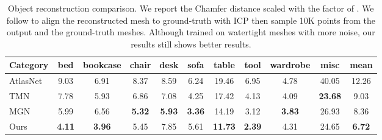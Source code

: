 \documentclass[final]{cvpr}
\newcommand{\beforecaption}{\vspace{-1.2em}}
\begin{document}
\begin{table*}[!h]
    \vspace{-1.5em}
	\begin{center}
		\begin{tabular}{|l|c c c c c c c c c|c|}
			\hline
			Category & bed & bookcase & chair & desk & sofa & table & tool & wardrobe & misc & mean\\
			\hline\hline
			AtlasNet \cite{groueix2018} & 9.03 & 6.91 & 8.37 & 8.59 & 6.24 & 19.46 & 6.95 & 4.78 & 40.05 & 12.26\\
			TMN \cite{pan2019deep} & 7.78 & 5.93 & 6.86 & 7.08 & 4.25 & 17.42 & 4.13 & 4.09 & \textbf{23.68} & 9.03\\
			MGN \cite{nie2020total3dunderstanding} & 5.99 & 6.56 & \textbf{5.32} & \textbf{5.93} & \textbf{3.36} & 14.19 & 3.12 & \textbf{3.83} & 26.93 & 8.36\\
			Ours & \textbf{4.11} & \textbf{3.96} & 5.45 & 7.85 & 5.61 & \textbf{11.73} & \textbf{2.39} & 4.31 & 24.65 & \textbf{6.72}\\
			\hline
		\end{tabular}
	\end{center}
	\vspace{-0.5em}
	\beforecaption
	\caption{Object reconstruction comparison. We report the Chamfer distance scaled with the factor of . We follow \cite{nie2020total3dunderstanding} to align the reconstructed mesh to ground-truth with ICP then sample 10K points from the output and the ground-truth meshes. Although trained on watertight meshes with more noise, our results still shows better results.}
	\vspace{-0.5em}
	\label{tbl:objrecon}
\end{table*}
\end{document}
